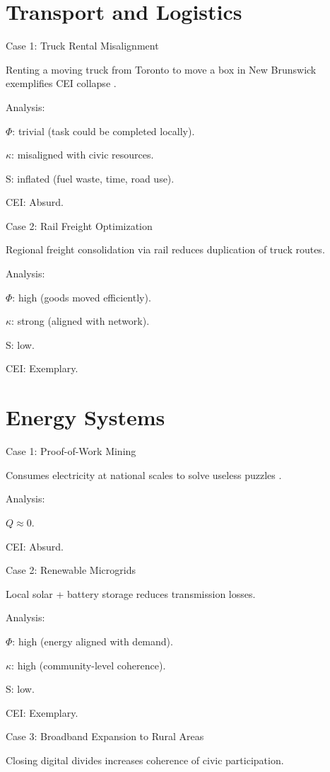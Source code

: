 \documentclass[openany]{book}
\begin{document}
\section{Transport and Logistics}

Case 1: Truck Rental Misalignment

Renting a moving truck from Toronto to move a box in New Brunswick exemplifies CEI collapse \cite{toronto2025}.

Analysis:

\(\Phi\): trivial (task could be completed locally).

\(\kappa\): misaligned with civic resources.

S: inflated (fuel waste, time, road use).

CEI: Absurd.

Case 2: Rail Freight Optimization

Regional freight consolidation via rail reduces duplication of truck routes.

Analysis:

\(\Phi\): high (goods moved efficiently).

\(\kappa\): strong (aligned with network).

S: low.

CEI: Exemplary.

\section{Energy Systems}

Case 1: Proof-of-Work Mining

Consumes electricity at national scales to solve useless puzzles \cite{nakamoto2008}.

Analysis:

\( Q \approx 0 \).

CEI: Absurd.

Case 2: Renewable Microgrids

Local solar + battery storage reduces transmission losses.

Analysis:

\(\Phi\): high (energy aligned with demand).

\(\kappa\): high (community-level coherence).

S: low.

CEI: Exemplary.

Case 3: Broadband Expansion to Rural Areas

Closing digital divides increases coherence of civic participation.
\end{document}
